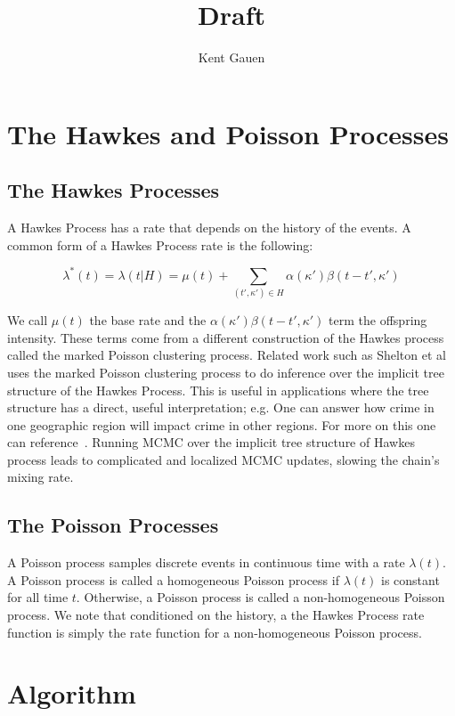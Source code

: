 \documentclass[11pt]{article}
\author{Kent Gauen}
\title{Draft}
\begin{document}
\maketitle

\section{The Hawkes and Poisson Processes}

\subsection{The Hawkes Processes}

\noindent A Hawkes Process has a rate that depends on the history of the events. A common form of a Hawkes Process rate is the following:

\[
  \lambda^*(t)
  =
  \lambda(t|H)
  =
  \mu(t)
  +
  \sum_{(t',\kappa')\in H}\alpha(\kappa')\beta(t-t',\kappa')
\]

\noindent We call $\mu(t)$ the base rate and the $\alpha(\kappa')\beta(t-t',\kappa')$ term the offspring intensity. These terms come from a different construction of the Hawkes process called the marked Poisson clustering process. Related work such as Shelton et al~\cite{AAAI1816985} uses the marked Poisson clustering process to do inference over the implicit tree structure of the Hawkes Process. This is useful in applications where the tree structure has a direct, useful interpretation; e.g. One can answer how crime in one geographic region will impact crime in other regions. For more on this one can reference~\cite{Rasmussen2013}. Running MCMC over the implicit tree structure of Hawkes process leads to complicated and localized MCMC updates, slowing the chain's mixing rate.

\subsection{The Poisson Processes}

\noindent A Poisson process samples discrete events in continuous time with a rate $\lambda(t)$. A Poisson process is called a homogeneous Poisson process if $\lambda(t)$ is constant for all time $t$. Otherwise, a Poisson process is called a non-homogeneous Poisson process. We note that conditioned on the history, a the Hawkes Process rate function is simply the rate function for a non-homogeneous Poisson process.

\section{Algorithm}
\end{document}
